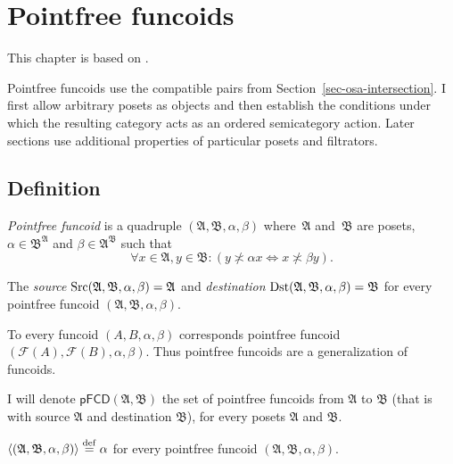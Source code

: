
\chapter{\label{pf-funcoids}Pointfree funcoids}

This chapter is based on \cite{pointfree}.

Pointfree funcoids use the compatible pairs from
Section~\ref{sec-osa-intersection}. I first allow arbitrary posets
as objects and then establish the conditions under which the resulting
category acts as an ordered semicategory action. Later sections use
additional properties of particular posets and filtrators.

\section{Definition}
\begin{defn}
\emph{Pointfree funcoid} is a quadruple
$(\mathfrak{A},\mathfrak{B},\alpha,\beta)$ where~$\mathfrak{A}$
and~$\mathfrak{B}$ are posets, $\alpha\in\mathfrak{B}^{\mathfrak{A}}$
and $\beta\in\mathfrak{A}^{\mathfrak{B}}$ such that 
\[
\forall x\in\mathfrak{A},y\in\mathfrak{B}:(y\nasymp\alpha x\Leftrightarrow x\nasymp\beta y).
\]

\end{defn}

\begin{defn}
The
\emph{source} $\operatorname{Src}(\mathfrak{A},\mathfrak{B},\alpha,\beta)=\mathfrak{A}$
and \emph{destination} $\operatorname{Dst}(\mathfrak{A},\mathfrak{B},\alpha,\beta)=\mathfrak{B}$
for every pointfree funcoid $(\mathfrak{A},\mathfrak{B},\alpha,\beta)$.
\end{defn}
To every funcoid $(A,B,\alpha,\beta)$ corresponds pointfree funcoid
$(\mathscr F(A),\mathscr F(B),\alpha,\beta)$. Thus pointfree funcoids are
a generalization of funcoids.
\begin{defn}
I will denote $\mathsf{pFCD}(\mathfrak{A},\mathfrak{B})$ the set
of pointfree funcoids from $\mathfrak{A}$ to $\mathfrak{B}$ (that
is with source $\mathfrak{A}$ and destination $\mathfrak{B}$), for
every posets $\mathfrak{A}$ and $\mathfrak{B}$.

$\left\langle (\mathfrak{A},\mathfrak{B},\alpha,\beta)\right\rangle\overset{\mathrm{def}}{=}\alpha$ for
every pointfree funcoid $(\mathfrak{A},\mathfrak{B},\alpha,\beta)$.
\end{defn}

